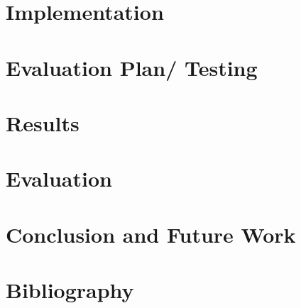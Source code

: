 \documentclass[12pt,a4paper]{report}
\begin{document}
\chapter{Implementation}


\chapter{Evaluation Plan/ Testing}


\chapter{Results}


\chapter{Evaluation}


\chapter{Conclusion and Future Work}


\chapter{Bibliography}
\begingroup
	\def\chapter*#1{}


\endgroup
\end{document}
